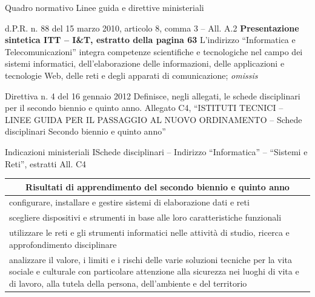 \documentclass[italian]{beamer}
\newcommand{\blu}[1]{{\usebeamercolor[fg]{structure} #1}}
\newcommand\mybullet{\leavevmode%
\blu{\usebeamertemplate{itemize item}}\hspace{.5em}}
\begin{document}
\begin{frame}[allowframebreaks]{Quadro normativo}
{Linee guida e direttive ministeriali}

	\begin{block}{d.P.R. n. 88 del 15 marzo 2010, articolo 8, comma 3 -- All. A.2}
		\medbreak
		\noindent\textbf{Presentazione sintetica ITT -- I\&T, estratto della pagina 63}
		\medbreak
		\mybullet L'indirizzo ``Informatica e Telecomunicazioni'' integra \alert{competenze} scientifiche e \alert{tecnologiche nel campo} dei sistemi informatici, dell'elaborazione delle informazioni, delle applicazioni e tecnologie Web, \alert{delle reti} e degli apparati \alert{di comunicazione}; \textit{omissis}
	\end{block}
	
	\begin{block}{Direttiva n. 4  del 16 gennaio 2012}
		\medbreak
		Definisce, negli allegati, le schede disciplinari per il secondo biennio e quinto anno.
		\medbreak
		Allegato C4, ``ISTITUTI TECNICI -- LINEE GUIDA PER IL PASSAGGIO AL NUOVO ORDINAMENTO -- Schede disciplinari Secondo biennio e quinto anno''
	\end{block}\label{dir:16012012}
\end{frame}

\begin{frame}{Indicazioni ministeriali I}{Schede disciplinari -- Indirizzo ``Informatica'' -- ``Sistemi e Reti'', estratti All. C4}
		\begin{tabular}{p{\dimexpr \linewidth-2\tabcolsep}}
		\toprule
		\multicolumn{1}{c}{\bf Risultati di apprendimento del secondo biennio e quinto anno}\\
		\midrule
			\mybullet \alert{configurare, installare e gestire sistemi di elaborazione dati e reti}\\
			\mybullet scegliere dispositivi e strumenti in base alle loro caratteristiche funzionali\\
			\mybullet \alert{utilizzare le reti e gli strumenti informatici} nelle attivit\`a di studio, ricerca e approfondimento disciplinare\\
			\mybullet \alert{analizzare il valore, i limiti e i rischi delle varie soluzioni tecniche} per la vita sociale e culturale con particolare attenzione alla sicurezza nei luoghi di vita e di lavoro, alla tutela della persona, dell'ambiente e del territorio\\
		\bottomrule
		\end{tabular}
\end{frame}
\end{document}

